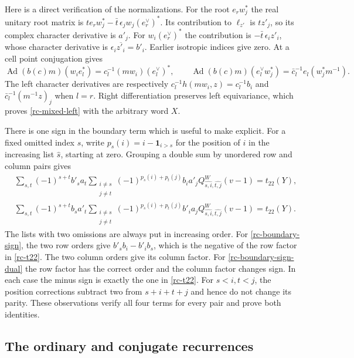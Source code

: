 Here is a direct verification of the normalizations.
For the root $e_r w_j^*$ the real unitary root
matrix is
$t e_r w_j^*-\bar t\,\epsilon_jw_j(e_r^\vee)^*$.
Its contribution to $\ell_{z'}$ is $t z'_j$,
so its complex character derivative is $a'_j$.
For $w_i(e_r^\vee)^*$ the contribution is
$-\bar t\,\epsilon_i z'_i$, whose character
derivative is $\epsilon_i\overline{z'_i}=b'_i$.
Earlier isotropic indices give zero.
At a cell point conjugation gives
\[
 \operatorname{Ad}(b(c)m)(w_i e_l^*)
      =c_l^{-1}(mw_i)(e_l^\vee)^*,\qquad
 \operatorname{Ad}(b(c)m)(e_l^\vee w_j^*)
      =\bar c_l^{-1}e_l(w_j^*m^{-1}).
\]
The left character derivatives are respectively
$c_l^{-1}h(mw_i,z)=c_l^{-1}b_i$
and $\bar c_l^{-1}(m^{-1}z)_j$ when $l=r$.
Right differentiation preserves left equivariance,
which proves \eqref{rc-mixed-left} with the
arbitrary word $X$.

There is one sign in the boundary term which is
useful to make explicit.  For a fixed omitted
index $s$, write
$p_s(i)=i-\mathbf1_{i>s}$ for the position of
$i$ in the increasing list $\widehat s$,
starting at zero.  Grouping a double sum by
unordered row and column pairs gives
\begin{align}
 &\sum_{s,t}(-1)^{s+t}b'_s a_t
       \sum_{\substack{i\ne s\\j\ne t}}
        (-1)^{p_s(i)+p_t(j)}b_i a'_j
            Q^W_{\widehat{s,i},\widehat{t,j}}(v-1)
       =t_{22}(Y),                                  \label{rc-boundary-sign}\\
 &\sum_{s,t}(-1)^{s+t}b_s a'_t
       \sum_{\substack{i\ne s\\j\ne t}}
        (-1)^{p_s(i)+p_t(j)}b'_i a_j
            Q^W_{\widehat{s,i},\widehat{t,j}}(v-1)
       =t_{22}(Y).                                  \label{rc-boundary-sign-dual}
\end{align}
The lists with two omissions are always put in
increasing order.
For \eqref{rc-boundary-sign}, the two row orders
give $b'_s b_i-b'_i b_s$, which is the negative
of the row factor in \eqref{rc-t22}.
The two column orders give its column factor.
For \eqref{rc-boundary-sign-dual} the row
factor has the correct order and the column
factor changes sign.  In each case the minus
sign is exactly the one in \eqref{rc-t22}.
For $s<i,t<j$, the position corrections
subtract two from $s+i+t+j$ and hence do not
change its parity.  These observations verify
all four terms for every pair and prove
both identities.

\subsection{The ordinary and conjugate recurrences}


